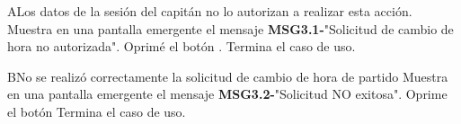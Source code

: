 \begin{UCtrayectoriaA}{A}{Los datos de la sesión del capitán no lo autorizan a realizar esta acción.}
	\UCpaso Muestra en una pantalla emergente el mensaje {\bf MSG3.1-}"Solicitud de cambio de hora no autorizada".
	\UCpaso[\UCactor] Oprimé el botón .
	\UCpaso Termina el caso de uso.
	\end{UCtrayectoriaA}

	\begin{UCtrayectoriaA}{B}{No se realizó correctamente la solicitud de cambio de hora de partido}
		\UCpaso Muestra en una pantalla emergente el mensaje {\bf MSG3.2-}"Solicitud NO exitosa".
		\UCpaso[\UCactor] Oprime el botón 
		\UCpaso Termina el caso de uso.
	\end{UCtrayectoriaA}
